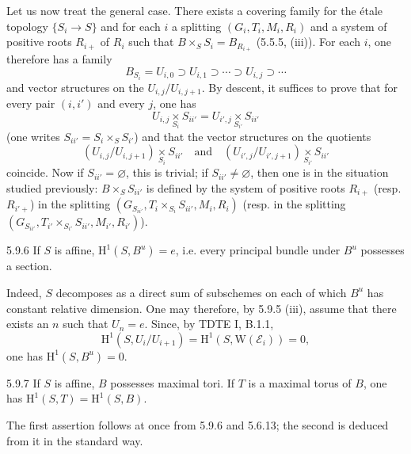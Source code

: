 Let us now treat the general case. There exists a covering family for the \'etale topology $\{S_i\to S\}$ and for each $i$ a splitting $(G_i,T_i,M_i,R_i)$ and a system of positive roots $R_{i+}$ of $R_i$ such that $B\times_S S_i=B_{R_{i+}}$ (5.5.5, (iii)). For each $i$, one therefore has a family
\[
B_{S_i}=U_{i,0}\supset U_{i,1}\supset\cdots\supset U_{i,j}\supset\cdots
\]
and vector structures on the $U_{i,j}/U_{i,j+1}$. By descent, it suffices to prove that for every pair $(i,i')$ and every $j$, one has
\[
U_{i,j}\underset{S_i}\times S_{ii'}=U_{i',j}\underset{S_{i'}}\times S_{ii'}
\]
(one writes $S_{ii'}=S_i\times_S S_{i'}$) and that the vector structures on the quotients
\[
(U_{i,j}/U_{i,j+1})\underset{S_i}\times S_{ii'}\quad\text{and}\quad
(U_{i',j}/U_{i',j+1})\underset{S_{i'}}\times S_{ii'}
\]
coincide. Now if $S_{ii'}=\varnothing$, this is trivial; if $S_{ii'}\ne\varnothing$, then one is in the situation studied previously: $B\times_S S_{ii'}$ is defined by the system of positive roots $R_{i+}$ (resp. $R_{i'+}$) in the splitting $(G_{S_{ii'}},T_i\times_{S_i}S_{ii'},M_i,R_i)$ (resp. in the splitting $(G_{S_{ii'}},T_{i'}\times_{S_{i'}}S_{ii'},M_{i'},R_{i'})$).
\begin{corollary}{5.9.6}\label{XXII.5.9.6}
If $S$ is affine, $\mathrm H^1(S,B^u)=e$, i.e. every principal bundle under $B^u$ possesses a section.
\end{corollary}
Indeed, $S$ decomposes as a direct sum of subschemes on each of which $B^u$ has constant relative dimension. One may therefore, by 5.9.5 (iii), assume that there exists an $n$ such that $U_n=e$. Since, by TDTE I, B.1.1,{\renewcommand{\thefootnote}{(56)}}
\[
\mathrm H^1(S,U_i/U_{i+1})=\mathrm H^1(S,\mathrm W(\mathcal E_i))=0,
\]
one has $\mathrm H^1(S,B^u)=0$.
\begin{corollary}{5.9.7}\label{XXII.5.9.7}
If $S$ is affine, $B$ possesses maximal tori. If $T$ is a maximal torus of $B$, one has $\mathrm H^1(S,T)=\mathrm H^1(S,B)$.
\end{corollary}
The first assertion follows at once from 5.9.6 and 5.6.13; the second is deduced from it in the standard way.{\renewcommand{\thefootnote}{(57)}}
